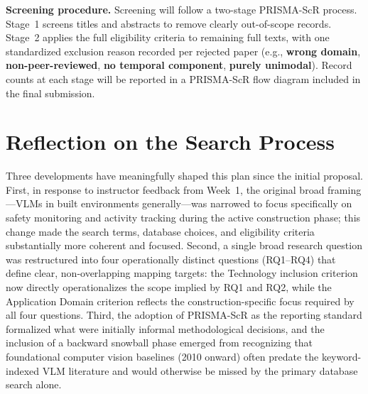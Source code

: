 \documentclass[12pt, letterpaper]{article}
\begin{document}
\vspace{8pt}
\noindent\textbf{Screening procedure.} Screening will follow a two-stage
PRISMA-ScR process. Stage~1 screens titles and abstracts to remove clearly
out-of-scope records. Stage~2 applies the full eligibility criteria to
remaining full texts, with one standardized exclusion reason recorded per
rejected paper (e.g., \textbf{wrong domain}, \textbf{non-peer-reviewed},
\textbf{no temporal component}, \textbf{purely unimodal}). Record counts at
each stage will be reported in a PRISMA-ScR flow diagram included in the
final submission.

\section{Reflection on the Search Process}

Three developments have meaningfully shaped this plan since the initial
proposal. First, in response to instructor feedback from Week~1, the original
broad framing---VLMs in built environments generally---was narrowed to focus
specifically on safety monitoring and activity tracking during the active
construction phase; this change made the search terms, database choices, and
eligibility criteria substantially more coherent and focused. Second, a single
broad research question was restructured into four operationally distinct
questions (RQ1--RQ4) that define clear, non-overlapping mapping targets:
the Technology inclusion criterion now directly operationalizes the scope
implied by RQ1 and RQ2, while the Application Domain criterion reflects the
construction-specific focus required by all four questions. Third, the
adoption of PRISMA-ScR as the reporting standard formalized what were initially
informal methodological decisions, and the inclusion of a backward snowball
phase emerged from recognizing that foundational computer vision baselines
(2010 onward) often predate the keyword-indexed VLM literature and would
otherwise be missed by the primary database search alone.

\end{document}
